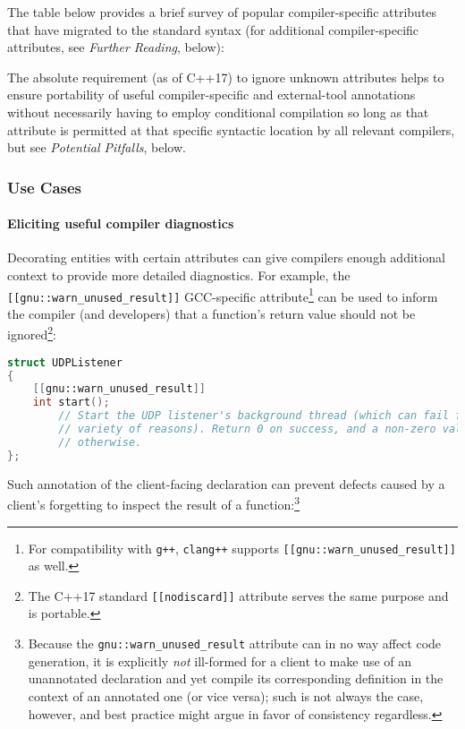 \documentclass[twoside,10pt,letterpaper,usenames]{newstyle-PearsonGeneric-7-38}
\newcommand{\intraref}[1]{\textit{#1}}
\begin{document}
The table below provides a brief survey of popular compiler-specific
attributes that have migrated to the standard syntax (for additional
compiler-specific attributes, see {\intraref{{Further Reading}}},
below):

The absolute requirement (as of C++17) to ignore unknown attributes
helps to ensure portability of useful compiler-specific and
external-tool annotations without necessarily having to employ
conditional compilation so long as that attribute is permitted at that
specific syntactic location by all relevant compilers, but see
{\intraref{{Potential Pitfalls}}}, below.

\subsubsection[Use Cases]{Use Cases}\label{use-cases}

\paragraph[Eliciting useful compiler diagnostics]{Eliciting useful compiler diagnostics}\label{eliciting-useful-compiler-diagnostics}

Decorating entities with certain attributes can give compilers enough
additional context to provide more detailed diagnostics. For example,
the \texttt{[[gnu::warn\_unused\_result]]} GCC-specific
attribute{\cprotect\footnote{For compatibility with \texttt{g++},
\texttt{clang++} supports \texttt{[[gnu::warn\_unused\_result]]} as
well.}} can be used to inform the compiler (and developers) that a
function's return value should not be ignored{\cprotect\footnote{The
C++17 standard \texttt{[[nodiscard]]} attribute serves the same
purpose and is portable.}}:

\begin{lstlisting}[language=C++]
struct UDPListener
{
    [[gnu::warn_unused_result]]
    int start();
        // Start the UDP listener's background thread (which can fail for a
        // variety of reasons). Return 0 on success, and a non-zero value
        // otherwise.
};
\end{lstlisting}
    

Such annotation of the client-facing declaration can prevent defects
caused by a client's forgetting to inspect the result of a
function:{\cprotect\footnote{Because the
\texttt{gnu::warn\_unused\_result} attribute can in no way affect code
generation, it is explicitly \emph{not} ill-formed for a client to
make use of an unannotated declaration and yet compile its
corresponding definition in the context of an annotated one (or vice
versa); such is not always the case, however, and best practice might
argue in favor of consistency regardless.}}
\end{document}
